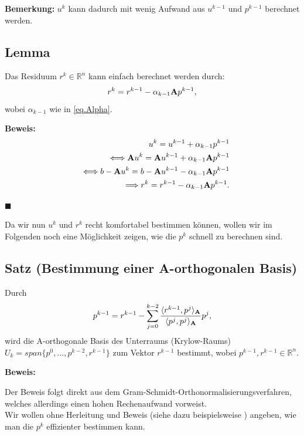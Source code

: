 \textbf{Bemerkung:}
$u^{k}$ kann dadurch mit wenig Aufwand aus $u^{k-1}$ und $p^{k-1}$ berechnet werden.

\subsection{Lemma}
Das Residuum $r^{k} \in \mathbb{R}^{n}$ kann einfach berechnet werden durch:
\begin{equation}
r^{k} = r^{k-1} - \alpha_{k-1}{\textbf{A}}p^{k-1},
\end{equation}
wobei $\alpha_{k-1}$ wie in \autoref{eq.Alpha}.

\textbf{Beweis:}
\begin{eqnarray}
&&u^{k} = u^{k-1} + \alpha_{k-1}p^{k-1} \notag \\
&&\Longleftrightarrow {\textbf{A}}u^{k} = {\textbf{A}}u^{k-1} + \alpha_{k-1}{\textbf{A}}p^{k-1} \notag \\
&&\Longleftrightarrow b - {\textbf{A}}u^{k} = b - {\textbf{A}}u^{k-1} - \alpha_{k-1}{\textbf{A}}p^{k-1} \notag \\
&&\Longrightarrow r^{k} = r^{k-1} - \alpha_{k-1}{\textbf{A}}p^{k-1}. \notag
\end{eqnarray}
\begin{flushright}
$\blacksquare$
\end{flushright}

Da wir nun $u^{k}$ und $r^{k}$ recht komfortabel bestimmen können, wollen wir im Folgenden noch eine Möglichkeit zeigen, wie die $p^{k}$ schnell zu berechnen sind.

\subsection{Satz (Bestimmung einer A-orthogonalen Basis)}
Durch
\begin{equation}
p^{k-1} = r^{k-1} - \sum_{j=0}^{k-2} \frac {\langle r^{k-1}, p^{j} \rangle _{{\textbf{A}}}} {\langle p^{j}, p^{j} \rangle _{{\textbf{A}}}} p^{j},
\end{equation}
wird die A-orthogonale Basis des Unterraums (Krylow-Raums) $U_{k} = span\{p^{0}, ..., p^{k-2},r^{k-1}\}$ zum Vektor $r^{k-1}$ bestimmt, wobei $p^{k-1},r^{k-1} \in \mathbb{R}^{n}$.

\textbf{Beweis:}

Der Beweis folgt direkt aus dem Gram-Schmidt-Orthonormalisierungsverfahren, welches allerdings einen hohen Rechenaufwand vorweist.\\
Wir wollen ohne Herleitung und Beweis (siehe dazu beispielsweise \cite[S. 570]{DR08}) angeben, wie man die $p^{k}$ effizienter bestimmen kann.

